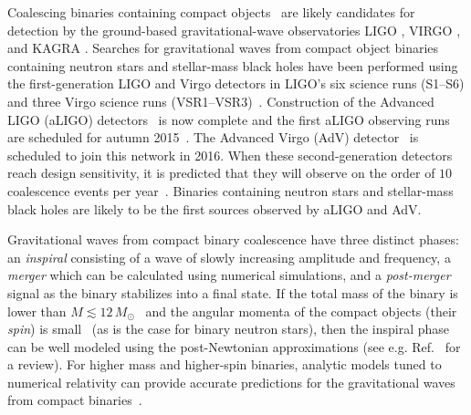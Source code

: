 \documentclass[12pt]{iopart} \usepackage{graphicx,amssymb}
\begin{document}
Coalescing binaries containing compact objects~\cite{Cutler:1992tc} are likely
candidates for detection by the ground-based gravitational-wave observatories
LIGO \cite{Abbott:2007kv}, VIRGO \cite{Accadia:2012zzb}, and KAGRA
\cite{Akutsu:2015hua}. Searches for gravitational waves from compact object
binaries containing neutron stars and stellar-mass black holes have been
performed using the first-generation LIGO and Virgo detectors in LIGO's six
science runs (S1--S6) and three Virgo science runs
(VSR1--VSR3)~\cite{Abbott:2003pj,Abbott:2005pe,Abbott:2005kq,Abbott:2007xi,Abbott:2007ai,Abbott:2009tt,Abbott:2009qj,Abadie:2010yba,Abadie:2011nz}.
Construction of the Advanced LIGO (aLIGO) detectors~\cite{TheLIGOScientific:2014jea} is now complete and the
first aLIGO observing runs are scheduled for autumn 2015~\cite{Aasi:2013wya}.
The Advanced Virgo (AdV) detector~\cite{Acernese:2015gua} is scheduled to join this network in 2016.
When these second-generation detectors reach design sensitivity, it is
predicted that they will observe on the order of $10$ coalescence events per
year~\cite{Abadie:2010cf}. Binaries containing neutron stars and stellar-mass
black holes are likely to be the first sources observed by aLIGO and AdV. 

Gravitational waves from compact binary coalescence have three distinct
phases: an \emph{inspiral} consisting of a wave of slowly increasing amplitude
and frequency, a \emph{merger} which can be calculated using numerical
simulations, and a \emph{post-merger} signal as the binary stabilizes into a final
state. If the total mass of the binary is lower than $M \lesssim 12\,
M_\odot$~\cite{Buonanno:2009zt,Brown:2012nn}
and the angular momenta of the compact objects (their \emph{spin}) is
small~\cite{Nitz:2013mxa,Kumar:2015tha}
(as is the case for binary neutron stars), then the inspiral phase can be 
well modeled using the post-Newtonian approximations (see e.g.
Ref.~\cite{Blanchet:2013haa} for a review).  For higher mass and higher-spin
binaries, analytic models tuned to numerical relativity can provide accurate
predictions for the gravitational waves from compact 
binaries~\cite{Buonanno:1998gg,Pan:2009wj,Damour:2012ky,Taracchini:2013rva,Damour:2014sva}. 
\end{document}
